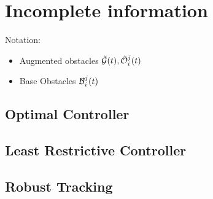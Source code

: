 \section{Incomplete information \label{sec:incomp}}
Notation:
\begin{itemize}
\item Augmented obstacles $\tilde{\mathcal{G}}(t), \tilde{\mathcal{O}}_i^j(t)$
\item Base Obstacles $\mathcal{B}_i^j(t)$
\end{itemize}

\subsection{Optimal Controller} \label{sec:incomp_optctrl}
\subsection{Least Restrictive Controller}  \label{sec:incomp_LRctrl}
\subsection{Robust Tracking}